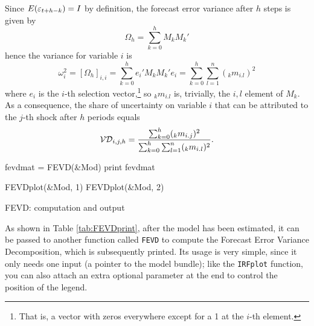 \documentclass[a4paper,10pt]{article}
\newcommand{\cmd}[1]{\texttt{#1}}
\newcommand{\StS}[1]{\ensuremath \varepsilon_{#1}} %
\newcommand{\FEVD}[1]{\ensuremath \mathcal{VD}_{#1}}
\begin{document}
Since $E(\StS{t+h-k}) = I$ by definition, the forecast error variance
after $h$ steps is given by
\[
  \Omega_h = \sum_{k=0}^h M_k M_k'
\]
hence the variance for variable $i$ is
\[
  \omega^2_i = \left[ \Omega_h \right]_{i,i} = \sum_{k=0}^h e_i' M_k M_k' e_i =
  \sum_{k=0}^h \sum_{l=1}^n ({}_km_{i.l})^2 
\]
where $e_i$ is the $i$-th selection vector,\footnote{That is, a vector
  with zeros everywhere except for a 1 at the $i$-th element.} so
${}_km_{i.l}$ is, trivially, the $i,l$ element of $M_k$. As a
consequence, the share of uncertainty on variable $i$ that can be
attributed to the $j$-th shock after $h$ periods equals
\[
  \FEVD{i,j,h} =
  \frac{\sum_{k=0}^h ({}_km_{i.j})^2 }{\sum_{k=0}^h \sum_{l=1}^n
    ({}_km_{i.l})^2 } .
\]

\begin{table}[htbp]
\begin{scode}
  fevdmat = FEVD(&Mod)
  print fevdmat

  FEVDplot(&Mod, 1)
  FEVDplot(&Mod, 2)
  \end{scode}
  \caption{FEVD: computation and output}
  \label{tab:FEVDprint}
\end{table}

As shown in Table \ref{tab:FEVDprint}, after the model has been
estimated, it can be passed to another function called \texttt{FEVD}
to compute the Forecast Error Variance Decomposition, which is
subsequently printed. Its usage is very simple, since it only needs
one input (a pointer to the model bundle); like the \cmd{IRFplot}
function, you can also attach an extra optional parameter at the end
to control the position of the legend.
\end{document}
